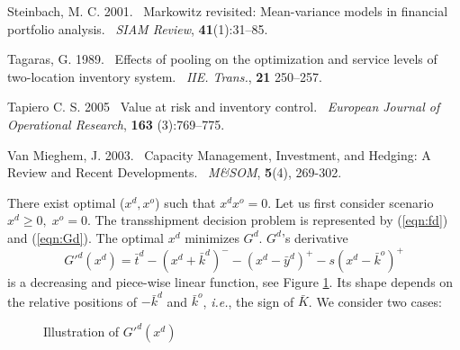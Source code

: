 \documentclass[mnsc,nonblindrev,copyedit]{informs2_wz} %
\def\newblock{\ }%
\newcommand{\OUT}[1]{}
\begin{document}
\begin{thebibliography}{1}
Steinbach, M. C. 2001.
\newblock Markowitz revisited: Mean-variance models in financial portfolio
  analysis.
\newblock {\em SIAM Review}, {\bf 41}(1):31--85.

Tagaras, G. 1989.
\newblock Effects of pooling on the optimization and service levels of
  two-location inventory system.
\newblock {\em IIE. Trans.}, {\bf 21} 250--257.

Tapiero C. S. 2005
\newblock Value at risk and inventory control.
\newblock {\em European Journal of Operational Research}, {\bf 163} (3):769--775.


Van Mieghem, J. 2003.
\newblock {Capacity Management, Investment, and Hedging: A Review and Recent Developments.}
\newblock {\em M\&SOM}, {\bf 5}(4), 269-302.

\end{thebibliography}

%
%

\ECSwitch

\ECDisclaimer


\OUT{
\newpage

\setcounter{page}{1}


\section*{On-Line Appendix}
}



There exist optimal ($x^d,x^o$) such that $x^dx^o =0$.  Let us first consider scenario $x^d \geq 0, \;x^o =0$.  The transshipment decision problem is represented by (\ref{eqn:fd}) and (\ref{eqn:Gd}).  The optimal $x^d$ minimizes $G^d$.  $G^d$'s derivative 
\begin{equation}
G'^d(x^d) = \bar{t}^d - (x^d+\bar{k}^d )^- -(x^d - \bar{y}^d)^+
-s(x^d-\bar{k}^o)^+
\end{equation}
is a decreasing and piece-wise linear function, see Figure \ref{fig:xdPrice}.  Its shape depends on the relative positions of $-\bar{k}^d$ and $\bar{k}^o$, {\it i.e.}, the sign of $\bar{K}$.  We consider two cases:
\begin{figure} [ht]
\begin{center}
\end{center}
\caption{Illustration of $G'^d(x^d)$}\label{fig:xdPrice}
\end{figure}
\end{document}
